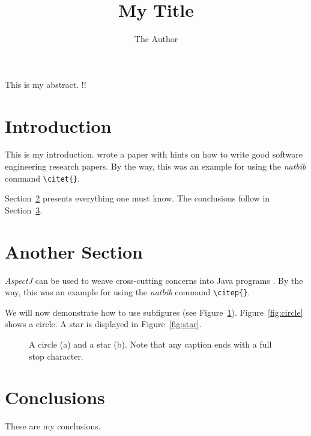 \documentclass[pdftex,english,oribibl]{llncs}
\title{My Title}
\author{The Author}
\institute{University of Stuttgart\\Institute of Software Engineering (ISTE)\\70569 Stuttgart, Germany}
\makeatletter
\gdef\@keywords{}
\renewenvironment{abstract}{%
  \list{}{\advance\topsep by0.35cm\relax\small%
          \leftmargin=1cm%
          \labelwidth=\z@%
          \listparindent=\z@%
          \itemindent\listparindent%
          \rightmargin\leftmargin}%
          \item[\hskip\labelsep\bfseries\abstractname]}{%
  \if!\@keywords!\else{\item[~]\item[\hskip\labelsep\bfseries\keywordname]\@keywords}\fi%
  \endlist}
\makeatother
\begin{document}
\maketitle

\begin{abstract}
  This is my abstract.
\end{abstract}

\section{Introduction}

  This is my introduction. \citet{Shaw2003WritingGoodSoftwareEngineeringResearchPapersMinitutorial} wrote a paper with hints on how to write good software engineering research papers. By the way, this was an example for using the \textit{natbib} command \texttt{\textbackslash{}citet\{\}}.

  Section~\ref{sec:anotherSection} presents everything one must know. The conclusions follow in Section~\ref{sec:conclusions}.

\section{Another Section}\label{sec:anotherSection}

  \textit{AspectJ} can be used to weave cross-cutting concerns into Java programs \citep{AspectJ2007}. By the way, this was an example for using the \textit{natbib} command \texttt{\textbackslash{}citep\{\}}.

  We will now demonstrate how to use subfigures (see Figure~\ref{fig:subfig}). Figure~\ref{fig:circle} shows a circle. A star is displayed in Figure~\ref{fig:star}.

  \begin{figure}
    \centering
    \caption{A circle (a) and a star (b). Note that any caption ends with a full stop character.}
    \label{fig:subfig}
  \end{figure}

\section{Conclusions}\label{sec:conclusions}

  These are my conclusions.


\end{document}
